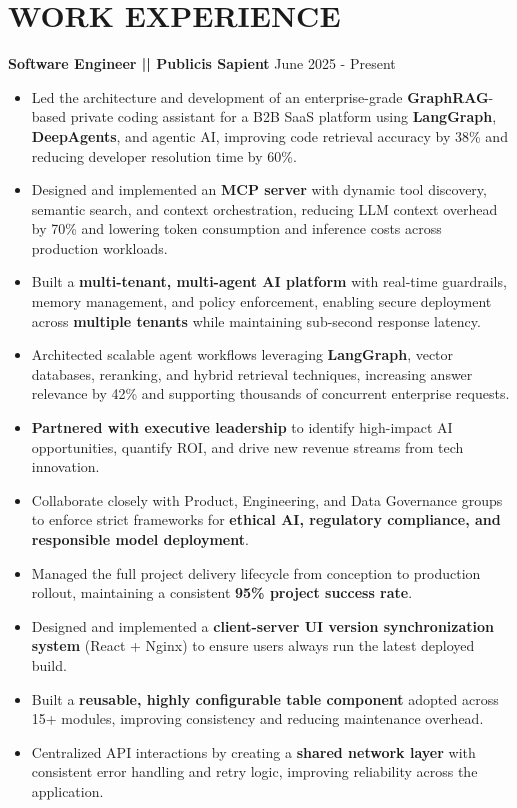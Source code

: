 \documentclass[a4paper]{article}
\begin{document}
\section*{WORK EXPERIENCE}
\textbf{Software Engineer || Publicis Sapient}
\hfill June 2025 - Present
\begin{itemize}
\vspace{2pt}
\item {Led the architecture and development of an enterprise-grade \textbf{GraphRAG}-based private coding assistant for a B2B SaaS platform using \textbf{LangGraph}, \textbf{DeepAgents}, and agentic AI, improving code retrieval accuracy by 38\% and reducing developer resolution time by 60\%.}
\item {Designed and implemented an \textbf{MCP server} with dynamic tool discovery, semantic search, and context orchestration, reducing LLM context overhead by 70\% and lowering token consumption and inference costs across production workloads.}
\item {Built a \textbf{multi-tenant, multi-agent AI platform} with real-time guardrails, memory management, and policy enforcement, enabling secure deployment across \textbf{multiple tenants} while maintaining sub-second response latency.}
\item {Architected scalable agent workflows leveraging \textbf{LangGraph}, vector databases, reranking, and hybrid retrieval techniques, increasing answer relevance by 42\% and supporting thousands of concurrent enterprise requests.}
\item {\textbf{Partnered with executive leadership} to identify high-impact AI opportunities, quantify ROI, and drive new revenue streams from tech innovation.}
\item {Collaborate closely with Product, Engineering, and Data Governance groups to enforce strict frameworks for \textbf{ethical AI, regulatory compliance, and responsible model deployment}.}
\item {Managed the full project delivery lifecycle from conception to production rollout, maintaining a consistent \textbf{95\% project success rate}.}
\item  {Designed and implemented a \textbf{client-server UI version synchronization system} (React + Nginx) to ensure users always run the latest deployed build.}
\item  {Built a \textbf{reusable, highly configurable table component} adopted across 15+ modules, improving consistency and reducing maintenance overhead.}
\item  {Centralized API interactions by creating a \textbf{shared network layer} with consistent error handling and retry logic, improving reliability across the application.}

\end{itemize}
\end{document}
